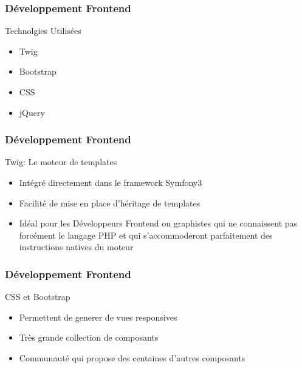 \speaker{\Juliana}

\begin{frame}
\frametitle{Développement Frontend}
\begin{block}{Technolgies Utilisées}
	\begin{itemize}
		\item Twig
		\item Bootstrap
		\item CSS
		\item jQuery
	\end{itemize}
\end{block}
\end{frame}

\begin{frame}
\frametitle{Développement Frontend}
\begin{block}{Twig: Le moteur de templates }
	\begin{itemize}
		\item Intégré directement dans le framework Symfony3
		\item Facilité de mise en place d'héritage de templates
		\item Idéal pour les Développeurs Frontend ou graphistes qui ne connaissent pas forcément le langage PHP et qui s'accommoderont parfaitement des instructions natives du moteur
	\end{itemize}
\end{block}
\end{frame}

\begin{frame}
\frametitle{Développement Frontend}
\begin{block}{ CSS et Bootstrap }
	\begin{itemize}
		\item Permettent de generer de vues responsives
		\item Très grande collection de composants
		\item Communauté qui propose des centaines d'autres composants
	\end{itemize}
\end{block}
\end{frame}

